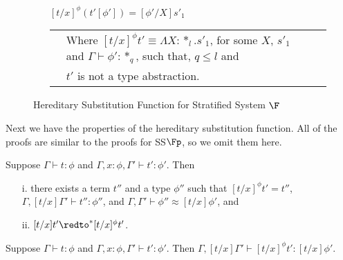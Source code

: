 \begin{figure}[t]
\begin{itemize}
    \item[] $[t/x]^{\phi} (t'[\phi']) = [\phi'/X]s'_1$\\
      \begin{tabular}{lll}
        & Where $[t/x]^{\phi} t' \equiv \Lambda X:*_l.s'_1$,
        for some $X$, $s'_1$ and $\Gamma \vdash \phi':*_q$, such that, $q \leq l$ and\\
	& $t'$ is not a type abstraction.
      \end{tabular}
  \end{itemize}
  \caption{Hereditary Substitution Function for Stratified System $\F$}
  \label{fig:hereditary_substitution_function_ssfe}
\end{figure}
Next we have the properties of the hereditary substitution function.
All of the proofs are similar to the proofs for SS$\Fp$, so we omit
them here.
\begin{lemma}
  \label{lemma:total_ssfe}
  Suppose $\Gamma \vdash t : \phi$ and $\Gamma, x:\phi, \Gamma' \vdash t':\phi'$.  Then
  \begin{itemize}
  \item[i.] there exists a term $t''$ and a type $\phi''$ such that $[t/x]^\phi t' = t''$, 
    $\Gamma,[t/x]\Gamma' \vdash t'':\phi''$, and $\Gamma,\Gamma' \vdash \phi'' \approx [t/x]\phi'$, and
  \item[ii.] $[t/x]t' \redto^* [t/x]^\phi t'$.
  \end{itemize}
\end{lemma}

\begin{corollary}
  \label{corollary:type_preserving_ssfe}
  Suppose $\Gamma \vdash t : \phi$ and $\Gamma, x:\phi, \Gamma' \vdash t':\phi'$. Then
  $\Gamma,[t/x]\Gamma' \vdash [t/x]^\phi t':[t/x]\phi'$.
\end{corollary}

